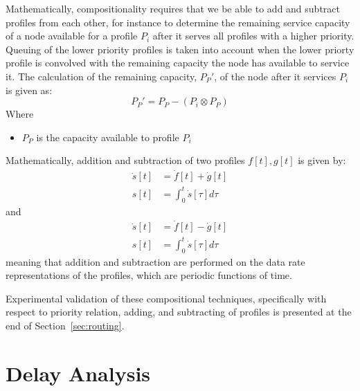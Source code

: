 Mathematically, compositionality requires that we be able to add and
subtract profiles from each other, for instance to determine the
remaining service capacity of a node available for a profile $P_i$
after it serves all profiles with a higher priority.  Queuing of the
lower priority profiles is taken into account when the lower priorty
profile is convolved with the remaining capacity the node has
available to service it.  The calculation of the remaining capacity,
$P_P'$, of the node after it services $P_i$ is given as:
\begin{equation}
  P_P' = P_P - ( P_i \otimes P_P )
\end{equation}
Where
\begin{itemize}
\item $P_P$ is the capacity available to profile $P_i$
\end{itemize}

Mathematically, addition and subtraction of two profiles $f[t],g[t]$ is given by:
\begin{equation}
  \begin{split}
    \dot s[t] &= \dot f[t] + \dot g[t]\\
    s[t] &= \int_{0}^t\dot s[\tau]d\tau
  \end{split}
\end{equation}
and
\begin{equation}
  \begin{split}
    \dot s[t] &= \dot f[t] - \dot g[t]\\
    s[t] &= \int_{0}^t\dot s[\tau]d\tau
  \end{split}
\end{equation}
meaning that addition and subtraction are performed on the data rate
representations of the profiles, which are periodic functions of time.

Experimental validation of these compositional techniques,
specifically with respect to priority relation, adding, and
subtracting of profiles is presented at the end of
Section~\ref{sec:routing}.

\newpage

\section{Delay Analysis}
\label{sec:delay}


